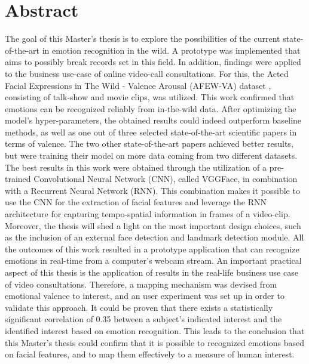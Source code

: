 \documentclass[11pt,a4paper]{scrbook}
\begin{document}
\begin{titlepage}
\end{titlepage}

\restoregeometry



\chapter{Abstract}
The goal of this Master's thesis is to explore the possibilities of the current state-of-the-art in emotion recognition in the wild. A prototype was implemented that aims to possibly break records set in this field. In addition, findings were applied to the business use-case of online video-call consultations.
\newline\newline
For this, the Acted Facial Expressions in The Wild - Valence Arousal (AFEW-VA) dataset \citep{Kossaifi:2017:AFEW-VADatabase}, consisting of talk-show and movie clips, was utilized. This work confirmed that emotions can be recognized reliably from in-the-wild data. After optimizing the model's hyper-parameters, the obtained results could indeed outperform baseline methods, as well as one out of three selected state-of-the-art scientific papers in terms of valence. The two other state-of-the-art papers achieved better results, but were training their model on more data coming from two different datasets.
\newline\newline
The best results in this work were obtained through the utilization of a pre-trained Convolutional Neural Network (CNN), called VGGFace, in combination with a Recurrent Neural Network (RNN). This combination makes it possible to use the CNN for the extraction of facial features and leverage the RNN architecture for capturing tempo-spatial information in frames of a video-clip. Moreover, the thesis will shed a light on the most important design choices, such as the inclusion of an external face detection and landmark detection module. All the outcomes of this work resulted in a prototype application that can recognize emotions in real-time from a computer's webcam stream.
\newline\newline
An important practical aspect of this thesis is the application of results in the real-life business use case of video consultations. Therefore, a mapping mechanism was devised from emotional valence to interest, and an user experiment was set up in order to validate this approach. It could be proven that there exists a statistically significant correlation of 0.35 between a subject's indicated interest and the identified interest based on emotion recognition. This leads to the conclusion that this Master's thesis could confirm that it is possible to recognized emotions based on facial features, and to map them effectively to a measure of human interest.
\end{document}
